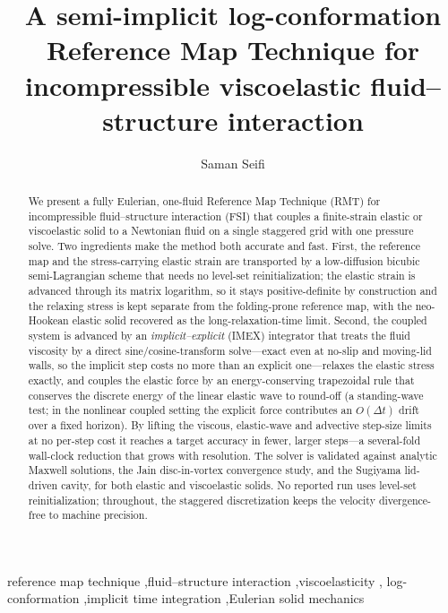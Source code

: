 \documentclass[final,3p,times]{elsarticle}
\theoremstyle{remark}
\newcommand{\dt}{\Delta t}
\begin{document}
\begin{frontmatter}

\title{A semi-implicit log-conformation Reference Map Technique for incompressible
viscoelastic fluid--structure interaction}

\author[bu]{Saman Seifi}
\address[bu]{Department of Mechanical Engineering, Boston University,
Boston, MA 02215, USA}



\begin{abstract}
We present a fully Eulerian, one-fluid Reference Map Technique (RMT) for incompressible
fluid--structure interaction (FSI) that couples a finite-strain elastic or viscoelastic
solid to a Newtonian fluid on a single staggered grid with one pressure solve. Two
ingredients make the method both accurate and fast. First, the reference map and the
stress-carrying elastic strain are transported by a low-diffusion bicubic semi-Lagrangian
scheme that needs no level-set reinitialization; the elastic strain is advanced through
its matrix logarithm, so it stays positive-definite by construction and the relaxing
stress is kept separate from the folding-prone reference map, with the neo-Hookean elastic
solid recovered as the long-relaxation-time limit. Second, the coupled system is advanced by an
\emph{implicit--explicit} (IMEX) integrator that treats the fluid viscosity by a direct
sine/cosine-transform solve---exact even at no-slip and moving-lid walls, so the implicit step
costs no more than an explicit one---relaxes the elastic stress exactly, and couples the elastic
force by an energy-conserving trapezoidal rule that conserves the discrete energy of the linear
elastic wave to round-off (a standing-wave test; in the nonlinear coupled setting the explicit
force contributes an $O(\dt)$ drift over a fixed horizon). By
lifting the viscous, elastic-wave and advective step-size limits at no per-step cost it reaches a
target accuracy in fewer, larger steps---a several-fold wall-clock reduction that grows with
resolution. The solver is validated against analytic Maxwell solutions, the Jain disc-in-vortex
convergence study, and the Sugiyama lid-driven cavity, for both elastic and viscoelastic solids.
No reported run uses level-set reinitialization; throughout, the staggered discretization keeps
the velocity divergence-free to machine precision.
\end{abstract}

\begin{keyword}
reference map technique \sep fluid--structure interaction \sep viscoelasticity \sep
log-conformation \sep implicit time integration \sep Eulerian solid mechanics
\end{keyword}

\end{frontmatter}
\end{document}
